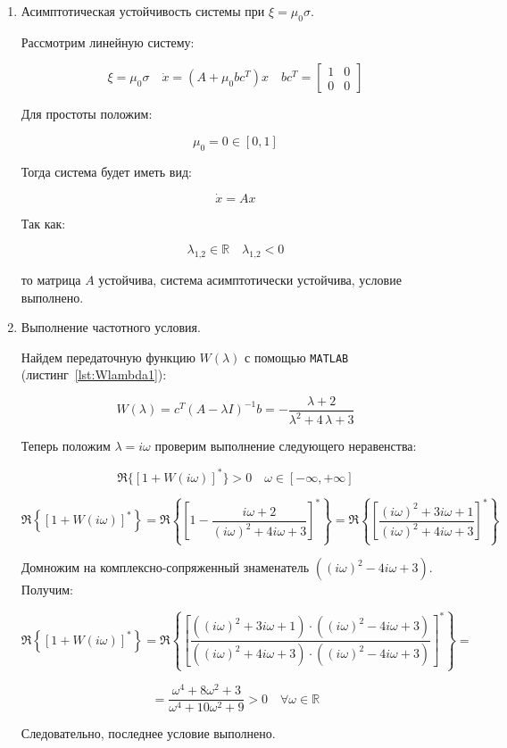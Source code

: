\documentclass[a4paper,12pt]{article}
\begin{document}
\begin{enumerate}
	   У матрицы нет чисто мнимых собственных значений, значит это условие выполнено.
	   
	   \item  Асимптотическая устойчивость системы при \(\xi  = \mu_0 \sigma\).
	   
	   Рассмотрим линейную систему:
	   
	   \[\xi = \mu_0 \sigma \quad \dot{x} = (A + \mu_0 b c^T)x \quad b c^T = 
	   \begin{bmatrix}
	   	1 & 0 \\
	   	0 & 0
	   \end{bmatrix}
	   \]
	   
	   Для простоты положим:
	   
	   \[\mu_0 = 0 \in [0, 1]\]
	   
	   Тогда система будет иметь вид:
	   
	   \[\dot{x} = A x\]
	   
	   Так как:
	   
	   \[\lambda_\text{1,2} \in \mathbb{R} \quad \lambda_\text{1,2} < 0\]
	   
	   то матрица \(A\) устойчива, система асимптотически устойчива, условие выполнено.
	   
	   \item Выполнение частотного условия.
	   
	   Найдем передаточную функцию \(W(\lambda)\) с помощью \texttt{MATLAB} (листинг~\ref{lst:Wlambda1}):
	   
	   \[W(\lambda) = c^T(A - \lambda I)^{-1} b  = -\frac{\lambda +2}{\lambda ^2+4\,\lambda +3}\]
	   
	   Теперь положим \(\lambda = i \omega\)  проверим выполнение следующего неравенства:
	   
	   \[\Re\{\left[1 + W(i \omega)\right]^*\} > 0 \quad \omega \in [-\infty, +\infty]\]
	   
	   \[
	   \Re\!\left\{ \left[1 + W(i\omega)\right]^* \right\}
	   =
	   \Re\!\left\{ \left[ 1 - \frac{i \omega + 2}{(i \omega)^2 + 4i \omega + 3} \right]^* \right\}
	   =
	    \Re\!\left\{ \left[\frac{(i \omega)^2 + 3 i \omega + 1}{(i \omega)^2 + 4i \omega + 3} \right]^* \right\}
	   \]
	   
	   Домножим на комплексно-сопряженный знаменатель \( \left((i \omega)^2 - 4i \omega + 3 \right) \). Получим:
	   
	   \[
	   \Re\!\left\{ \left[1 + W(i\omega)\right]^* \right\}
	   =
	    \Re\!\left\{ \left[\frac{((i \omega)^2 + 3 i \omega + 1) \cdot \left((i \omega)^2 - 4i \omega + 3 \right)}{((i \omega)^2 + 4i \omega + 3) \cdot \left((i \omega)^2 - 4i \omega + 3 \right)} \right]^* \right\} =
	   \]
	   
	   \[
	   = \frac{\omega^4 + 8\omega^2 + 3}{\omega^4 + 10\omega^2 + 9} > 0 \quad \forall \omega \in \mathbb{R}
	   \]
	   
		Следовательно, последнее условие выполнено.
		
	\end{enumerate}
\end{document}
